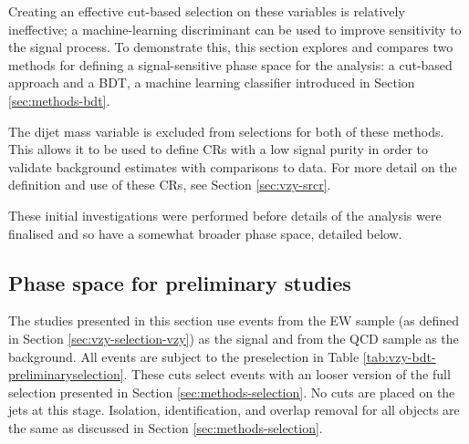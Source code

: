 Creating an effective cut-based selection on these variables is relatively
ineffective; a machine-learning discriminant can be used to improve sensitivity
to the signal process.  To demonstrate this, this section explores and compares
two methods for defining a signal-sensitive phase space for the analysis: a
cut-based approach and a \ac{BDT}, a machine learning classifier introduced in
Section \ref{sec:methods-bdt}.

The dijet mass variable is excluded from selections for both of
these methods. This allows it to be used to define \acp{CR} with a low signal
purity in order to validate background estimates with comparisons to data. For
more detail on the definition and use of these \acp{CR}, see Section
\ref{sec:vzy-srcr}.

These initial investigations were performed before details of the analysis
were finalised and so have a somewhat broader phase space, detailed below.

\subsection{Phase space for preliminary studies}

The studies presented in this section use events from the \ac{EW} \VZy sample
(as defined in Section \ref{sec:vzy-selection-vzy}) as the signal and from the
\ac{QCD} \Zy sample as the background. All events are subject to the
preselection in Table \ref{tab:vzy-bdt-preliminaryselection}.  These cuts select
\Zy events with an looser version of the full \Zy selection presented in
Section \ref{sec:methods-selection}.  No cuts are placed on the jets at this
stage.  Isolation, identification, and overlap removal for all objects are the
same as discussed in Section \ref{sec:methods-selection}.

